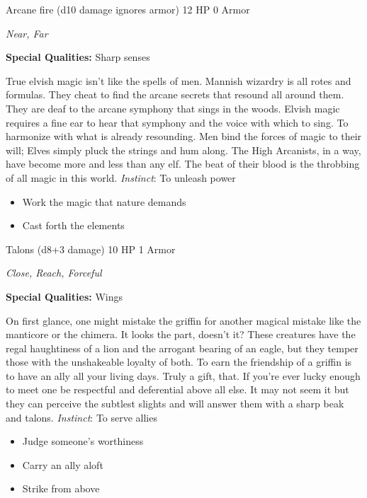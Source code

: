 Arcane fire (d10 damage ignores armor)\hspace*{\fill} 12 HP 0 Armor

\emph{Near, Far}

\textbf{Special Qualities:}
Sharp senses

\HRule
True elvish magic isn't like the spells of men. Mannish wizardry is all rotes and formulas. They cheat to find the arcane secrets that resound all around them. They are deaf to the arcane symphony that sings in the woods. Elvish magic requires a fine ear to hear that symphony and the voice with which to sing. To harmonize with what is already resounding. Men bind the forces of magic to their will; Elves simply pluck the strings and hum along. The High Arcanists, in a way, have become more and less than any elf. The beat of their blood is the throbbing of all magic in this world. \emph{Instinct}: To unleash power
\begin{itemize}
\item Work the magic that nature demands
\item Cast forth the elements
\end{itemize}

\HRule
{}

Talons (d8+3 damage)\hspace*{\fill} 10 HP 1 Armor

\emph{Close, Reach, Forceful}

\textbf{Special Qualities:}
Wings

\HRule
On first glance, one might mistake the griffin for another magical mistake like the manticore or the chimera. It looks the part, doesn't it? These creatures have the regal haughtiness of a lion and the arrogant bearing of an eagle, but they temper those with the unshakeable loyalty of both. To earn the friendship of a griffin is to have an ally all your living days. Truly a gift, that. If you're ever lucky enough to meet one be respectful and deferential above all else. It may not seem it but they can perceive the subtlest slights and will answer them with a sharp beak and talons. \emph{Instinct}: To serve allies
\begin{itemize}
\item Judge someone's worthiness
\item Carry an ally aloft
\item Strike from above
\end{itemize}

\HRule
{}

